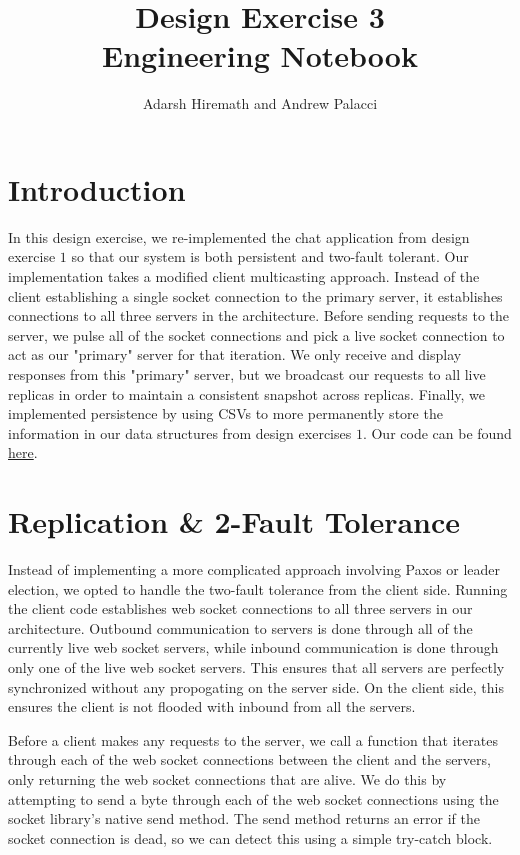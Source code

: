 \documentclass[
	a4paper, %
	10pt, %
	unnumberedsections, %
	twoside, %
]{LTJournalArticle}
\title{Design Exercise 3\\ Engineering Notebook} %
\author{%
	Adarsh Hiremath and Andrew Palacci
}
\begin{document}
\maketitle %


\section{Introduction}
In this design exercise, we re-implemented the chat application from design exercise $1$ so that our system is both persistent and two-fault tolerant. Our implementation takes a modified client multicasting approach. Instead of the client establishing a single socket connection to the primary server, it establishes connections to all three servers in the architecture. Before sending requests to the server, we pulse all of the socket connections and pick a live socket connection to act as our "primary" server for that iteration. We only receive and display responses from this "primary" server, but we broadcast our requests to all live replicas in order to maintain a consistent snapshot across replicas. Finally, we implemented persistence by using CSVs to more permanently store the information in our data structures from design exercises $1$. Our code can be found \href{https://github.com/andrewp2303/replication}{here}. 

\section{Replication \& 2-Fault Tolerance}

Instead of implementing a more complicated approach involving Paxos or leader election, we opted to handle the two-fault tolerance from the client side. Running the client code establishes web socket connections to all three servers in our architecture. Outbound communication to servers is done through all of the currently live web socket servers, while inbound communication is done through only one of the live web socket servers. This ensures that all servers are perfectly synchronized without any propogating on the server side. On the client side, this ensures the client is not flooded with inbound from all the servers.

Before a client makes any requests to the server, we call a function that iterates through each of the web socket connections between the client and the servers, only returning the web socket connections that are alive. We do this by attempting to send a byte through each of the web socket connections using the socket library's native send method. The send method returns an error if the socket connection is dead, so we can detect this using a simple try-catch block.
\end{document}
